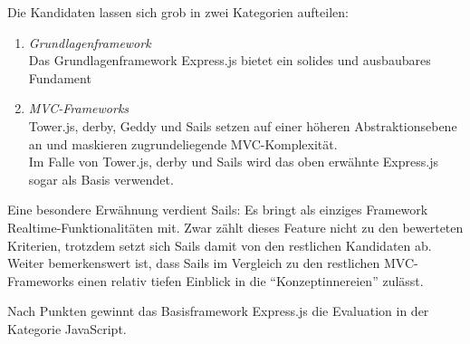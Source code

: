 Die Kandidaten lassen sich grob in zwei Kategorien aufteilen:

\begin{enumerate}
	\item \emph{Grundlagenframework} \\
	Das Grundlagenframework Express.js bietet ein solides und ausbaubares Fundament
	\item \emph{MVC-Frameworks} \\
	Tower.js, derby, Geddy und Sails setzen auf einer höheren Abstraktionsebene an und maskieren zugrundeliegende MVC-Komplexität. \\ Im Falle von Tower.js, derby und Sails wird das oben erwähnte Express.js sogar als Basis verwendet.
\end{enumerate}

Eine besondere Erwähnung verdient Sails: Es bringt als einziges Framework \gls{Realtime}-Funktionalitäten mit. Zwar zählt dieses Feature nicht zu den bewerteten Kriterien, trotzdem setzt sich Sails damit von den restlichen Kandidaten ab. Weiter bemerkenswert ist, dass Sails im Vergleich zu den restlichen MVC-Frameworks einen relativ tiefen Einblick in die ``Konzeptinnereien'' zulässt.

Nach Punkten gewinnt das Basisframework Express.js die Evaluation in der Kategorie JavaScript.
